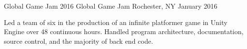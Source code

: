 \begin{cventries}

\cventry
{Global Game Jam 2016} %
{Global Game Jam} %
{Rochester, NY} %
{January 2016} %
{ %
\begin{cvitems}
\item {Led a team of six in the production of an infinite platformer game in Unity Engine over 48 continuous hours. Handled program architecture, documentation, source control, and the majority of back end code.}
\end{cvitems}
}



\end{cventries}